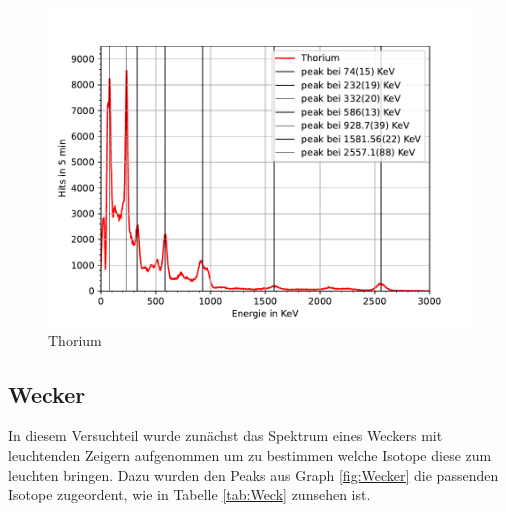 \documentclass[11pt, a4paper]{article}
\begin{document}
    \begin{figure}[!h]
        \centering
        \includegraphics[width=\textwidth]{Plots/Thorium.pdf}
        \caption{Thorium}
        \label{fig:thor}
    \end{figure}

    

    
    \subsection{Wecker}
    In diesem Versuchteil wurde zunächst das Spektrum eines Weckers mit leuchtenden Zeigern aufgenommen um zu bestimmen welche Isotope diese zum leuchten bringen.
    Dazu wurden den Peaks aus Graph \ref{fig:Wecker} die passenden Isotope zugeordent, wie in Tabelle \ref{tab:Weck} zunsehen ist.
\end{document}
